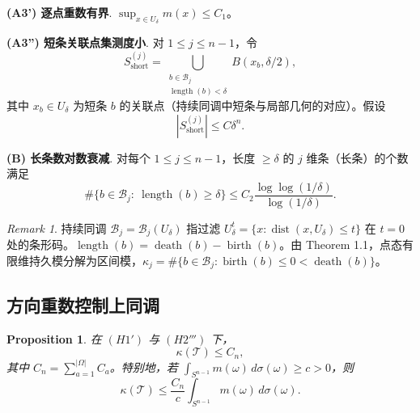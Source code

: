 \documentclass[11pt,a4paper]{article}
\newtheorem{proposition}[theorem]{Proposition}
\theoremstyle{remark}
\newtheorem{remark}[theorem]{Remark}
\begin{document}
	\noindent\textbf{(A3') 逐点重数有界}. $\sup_{x\in U_\delta}m(x)\le C_1$。
	
	\noindent\textbf{(A3'') 短条关联点集测度小}. 对 $1\le j\le n-1$，令
	\[
	S_{\mathrm{short}}^{(j)}=\bigcup_{\substack{b\in\mathcal B_j\\ \operatorname{length}(b)<\delta}} B(x_b,\delta/2),
	\]
	其中 $x_b\in U_\delta$ 为短条 $b$ 的关联点（持续同调中短条与局部几何的对应）。假设
	\[
	|S_{\mathrm{short}}^{(j)}|\le C\delta^n.
	\]
	
	\noindent\textbf{(B) 长条数对数衰减}. 对每个 $1\le j\le n-1$，长度 $\ge\delta$ 的 $j$ 维条（长条）的个数满足
	\[
	\#\{b\in\mathcal B_j:\ \operatorname{length}(b)\ge\delta\}\le C_2\frac{\log\log(1/\delta)}{\log(1/\delta)}.
	\]
	
	\begin{remark}
		持续同调 $\mathcal B_j=\mathcal B_j(U_\delta)$ 指过滤 $U_\delta^t=\{x:\operatorname{dist}(x,U_\delta)\le t\}$ 在 $t=0$ 处的条形码。$\operatorname{length}(b)=\operatorname{death}(b)-\operatorname{birth}(b)$。由 \cite{CrawleyBoevey2015} Theorem 1.1，点态有限维持久模分解为区间模，$\kappa_j=\#\{b\in\mathcal B_j:\operatorname{birth}(b)\le0<\operatorname{death}(b)\}$。
	\end{remark}
	
	\subsection{方向重数控制上同调}
	\begin{proposition}
		在 $(H1')$ 与 $(H2''')$ 下，
		\[
		\kappa(\mathcal T)\le C_n,
		\]
		其中 $C_n=\sum_{a=1}^{|\Omega|}C_a$。特别地，若 $\int_{S^{n-1}}m(\omega)\,d\sigma(\omega)\ge c>0$，则
		\[
		\kappa(\mathcal T)\le\frac{C_n}{c}\int_{S^{n-1}}m(\omega)\,d\sigma(\omega).
		\]
	\end{proposition}
	
\end{document}
